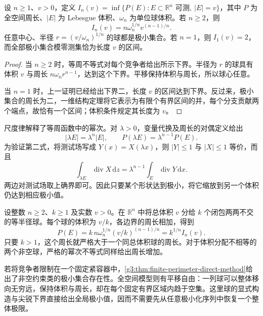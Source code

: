 \begin{proposition}\label{g3:prop:fixed-volume-ball-minimizer}
	设 \(n\ge1\)、\(v>0\)，定义 \(I_n(v)=\inf\{P(E):E\subset\mathbb R^n\text{ 可测},\ |E|=v\}\)，其中 \(P\) 为全空间周长、\(|E|\) 为 Lebesgue 体积、\(\omega_n\) 为单位球体积。若 \(n\ge2\)，则
	\[
		I_n(v)=n\omega_n^{1/n}v^{(n-1)/n}.
	\]
	任意中心、半径 \(r=(v/\omega_n)^{1/n}\) 的球都是极小集合。若 \(n=1\)，则 \(I_1(v)=2\)，而全部极小集合模零测集恰为长度 \(v\) 的区间。
\end{proposition}
\begin{proof}
	当 \(n\ge2\) 时，等周不等式对每个竞争者给出所示下界。半径为 \(r\) 的球具有体积 \(v\) 与周长 \(n\omega_nr^{n-1}\)，达到这个下界。平移保持体积与周长，所以球心任意。

	当 \(n=1\) 时，上一证明已经给出下界二，长度 \(v\) 的区间达到下界。反过来，极小集合的周长为二，一维结构定理将它表示为有限个有界区间的并，每个分支贡献两个端点，故恰有一个区间；体积条件规定其长度为 \(v\)。
\end{proof}

尺度律解释了等周函数中的幂次。对 \(\lambda>0\)，变量代换及周长的对偶定义给出
\[
	|\lambda E|=\lambda^n|E|,\qquad P(\lambda E)=\lambda^{n-1}P(E).
\]
为验证第二式，将测试场写成 \(Y(x)=X(\lambda x)\)，则 \(|Y|\le1\) 与 \(|X|\le1\) 等价，而且
\[
	\int_{\lambda E}\operatorname{div}X\,\mathrm dz
	=\lambda^{n-1}\int_E\operatorname{div}Y\,\mathrm dx.
\]
两边对测试场取上确界即可。因此只要某个形状达到极小，将它缩放到另一个体积仍达到相应极小值。

\begin{example}\label{g3:exm:fragmented-balls}
	设整数 \(n\ge2\)、\(k\ge1\) 及实数 \(v>0\)。在 \(\mathbb R^n\) 中将总体积 \(v\) 分给 \(k\) 个闭包两两不交的等半径球。每个球的体积为 \(v/k\)，各边界的周长相加，得到
	\[
		P(E)=k\,n\omega_n^{1/n}(v/k)^{(n-1)/n}
		=k^{1/n}I_n(v).
	\]
	只要 \(k>1\)，这个周长就严格大于一个同总体积球的周长。对于体积分配不相等的两个非空球，严格的幂次不等式同样给出周长增加。
\end{example}

若将竞争者限制在一个固定紧容器中，\cref{g3:thm:finite-perimeter-direct-method}给出了非空约束类的极小集合存在性。全空间模型则有平移自由：一列球可以整体移向无穷远，保持体积与周长，却在每个固定有界区域内趋于空集。这里球的显式构造与尖锐下界直接给出全局极小值，因而不需要先从任意极小化序列中恢复一个整体极限。
